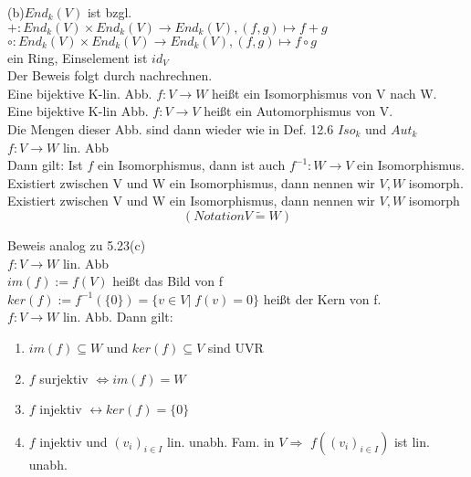 \documentclass[headsepline,12pt,a4paper]{scrartcl}
\makeatletter
\def\myItem{%
   \@ifnextchar[ \@myItem{\@noitemargtrue\@myItem[\@itemlabel]}}
\def\@myItem[#1]{\item[#1]\mbox{}\\}
\makeatother
\begin{document}
(b)$End_k (V)$ ist bzgl. \\
$+: End_k (V) \times End_k (V) \rightarrow End_k (V), (f,g) \mapsto f+g$\\
$\circ: End_k (V) \times End_k (V) \rightarrow End_k (V), (f,g) \mapsto f \circ g$\\

ein Ring, Einselement ist $id_V$ \\

Der Beweis folgt durch nachrechnen. \\

\myItem[Def.12.7]
Eine bijektive K-lin. Abb. $f: V \rightarrow W$ heißt ein Isomorphismus von V nach W. \\
Eine bijektive K-lin Abb. $f: V \rightarrow V$ heißt ein Automorphismus von V. \\
Die Mengen dieser Abb. sind dann wieder wie in Def. 12.6 $Iso_k$ und $Aut_k$ \\

\myItem[Bem.12.8]$f: V \rightarrow W$ lin. Abb \\
Dann gilt: Ist $f$ ein Isomorphismus, dann ist auch $f^{-1}: W \rightarrow V $ ein Isomorphismus. \\
Existiert zwischen V und W ein Isomorphismus, dann nennen wir $V,W$ isomorph. \\

Existiert zwischen V und W ein Isomorphismus, dann nennen wir $V,W$ isomorph $$ (Notation V\tilde{=}W)$$

Beweis analog zu 5.23(c) \\

\myItem[Def.12.9] $f: V \rightarrow W$ lin. Abb \\

$im(f):= f(V)$ heißt das Bild von f  \\
$ker(f):=f^{-1}(\{ 0 \})=\{v \in V|\; f(v) = 0 \} $ heißt der Kern von f. \\

\myItem[Bem.12.10]$f: V \rightarrow W$ lin. Abb.
Dann gilt: \\
\begin{enumerate}
\item $im(f) \subseteq W$ und $ker(f)\subseteq V$ sind UVR \\
\item $f$ surjektiv $\Leftrightarrow im(f) = W $ \\
\item $f$ injektiv $\leftrightarrow ker(f)=\{0\}$ \\
\item $f$ injektiv und $(v_i)_{i\in I}$ lin. unabh. Fam. in $ V \Rightarrow $ $f((v_i)_{i\in I})$ ist lin. unabh. \\
\end{enumerate}
\end{document}
